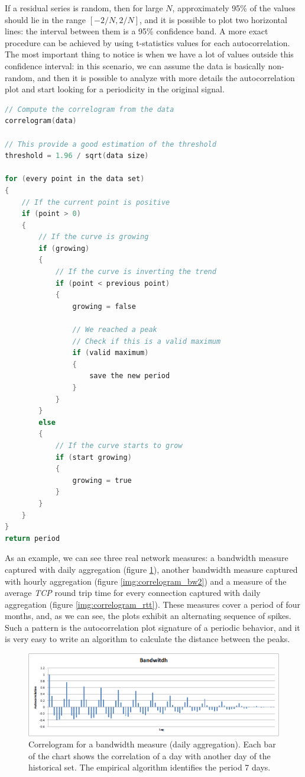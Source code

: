 \documentclass[12pt,a4paper,cucitura]{toptesi}
\begin{document}
If a residual series is random, then for large $N$, approximately 95\% of the values should lie in the range $\left [-2/N, 2/N\right ]$, and it is possible to plot two horizontal lines: the interval between them is a 95\% confidence band. 
A more exact procedure can be achieved by using t-statistics values for each autocorrelation.
The most important thing to notice is when we have a lot of values outside this confidence interval: in this scenario, we can assume the data is basically non-random, and then it is possible to analyze with more details the autocorrelation plot and start looking for a periodicity in the original signal.

\begin{lstlisting}[frame=shadowbox,caption=Algorithm for periodicity estimation using autocorrelation,language=C,tabsize=2,basicstyle=\scriptsize]
// Compute the correlogram from the data
correlogram(data)

// This provide a good estimation of the threshold
threshold = 1.96 / sqrt(data size)

for (every point in the data set)
{
	// If the current point is positive
	if (point > 0)
	{
		// If the curve is growing
		if (growing)
		{
			// If the curve is inverting the trend
			if (point < previous point)
			{
				growing = false

				// We reached a peak
				// Check if this is a valid maximum
				if (valid maximum)
				{
					save the new period
				}
			}
		}
		else
		{
			// If the curve starts to grow
			if (start growing)
			{
				growing = true
			}
		}
	}
}
return period
\end{lstlisting}

As an example, we can see three real network measures: a bandwidth measure captured with daily aggregation (figure \ref{img:correlogram_bw1}), another bandwidth measure captured with hourly aggregation (figure \ref{img:correlogram_bw2}) and a measure of the average \emph{TCP} round trip time for every connection captured with daily aggregation (figure \ref{img:correlogram_rtt}). These measures cover a period of four months, and, as we can see, the plots exhibit an alternating sequence of spikes. Such a pattern is the autocorrelation plot signature of a periodic behavior, and it is very easy to write an algorithm to calculate the distance between the peaks.

\begin{figure}
\centering
\includegraphics[width=\linewidth]{correlogram_bw1_2.png}
\caption[Correlogram for a bandwidth measure (daily aggregation)]{Correlogram for a bandwidth measure (daily aggregation). Each bar of the chart shows the correlation of a day with another day of the historical set. The empirical algorithm identifies the period 7 days.}
\label{img:correlogram_bw1}
\end{figure}
\end{document}
